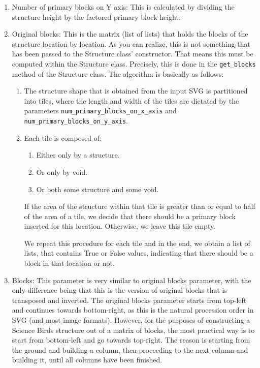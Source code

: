 \documentclass[12pt]{dalthesis}
\begin{document}
\begin{enumerate}
\begin{enumerate}
    \item Number of primary blocks on Y axis: This is calculated by dividing the structure height by the factored primary block height.
    \item Original blocks: This is the matrix (list of lists) that holds the blocks of the structure location by location. As you can realize, this is not something that has been passed to the Structure class' constructor. That means this must be computed within the Structure class. Precisely, this is done in the \lstinline{get_blocks} method of the Structure class. The algorithm is basically as follows:

    \begin{enumerate}
      \item The structure shape that is obtained from the input SVG is partitioned into tiles, where the length and width of the tiles are dictated by the parameters \lstinline{num_primary_blocks_on_x_axis} and \lstinline{num_primary_blocks_on_y_axis}.
      \item Each tile is composed of:

      \begin{enumerate}
        \item Either only by a structure.
        \item Or only by void.
        \item Or both some structure and some void.
      \end{enumerate}

      If the area of the structure within that tile is greater than or equal to half of the area of a tile, we decide that there should be a primary block inserted for this location. Otherwise, we leave this tile empty.

      We repeat this procedure for each tile and in the end, we obtain a list of lists, that contains True or False values, indicating that there should be a block in that location or not.
    \end{enumerate}

    \item Blocks: This parameter is very similar to original blocks parameter, with the only difference being that this is the version of original blocks that is transposed and inverted. The original blocks parameter starts from top-left and continues towards bottom-right, as this is the natural procession order in SVG (and most image formats). However, for the purposes of constructing a Science Birds structure out of a matrix of blocks, the most practical way is to start from bottom-left and go towards top-right. The reason is starting from the ground and building a column, then proceeding to the next column and building it, until all columns have been finished.


\end{enumerate}
\end{enumerate}
\end{document}
